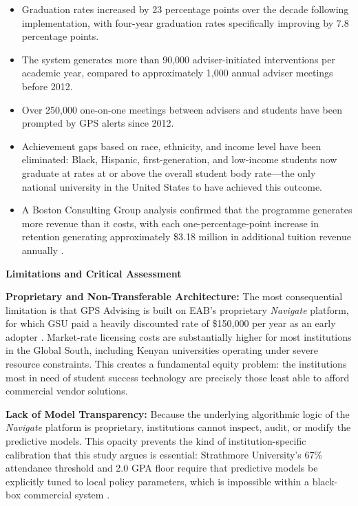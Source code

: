 \documentclass[12pt]{report}
\begin{document}
\begin{itemize}
    \item Graduation rates increased by 23 percentage points over the
    decade following implementation, with four-year graduation rates
    specifically improving by 7.8 percentage points.
    \item The system generates more than 90,000 adviser-initiated
    interventions per academic year, compared to approximately 1,000
    annual adviser meetings before 2012.
    \item Over 250,000 one-on-one meetings between advisers and students
    have been prompted by GPS alerts since 2012.
    \item Achievement gaps based on race, ethnicity, and income level
    have been eliminated: Black, Hispanic, first-generation, and
    low-income students now graduate at rates at or above the overall
    student body rate---the only national university in the United States
    to have achieved this outcome.
    \item A Boston Consulting Group analysis confirmed that the programme
    generates more revenue than it costs, with each one-percentage-point
    increase in retention generating approximately \$3.18 million in
    additional tuition revenue annually \parencite{Hechinger2019}.
\end{itemize}

\textbf{Limitations and Critical Assessment}

\textbf{Proprietary and Non-Transferable Architecture:} The most
consequential limitation is that GPS Advising is built on EAB's
proprietary \textit{Navigate} platform, for which GSU paid a heavily
discounted rate of \$150,000 per year as an early adopter
\parencite{Hechinger2019}. Market-rate licensing costs are substantially
higher for most institutions in the Global South,
including Kenyan universities operating under severe resource constraints.
This creates a fundamental equity problem: the institutions most in need
of student success technology are precisely those least able to afford
commercial vendor solutions.

\textbf{Lack of Model Transparency:} Because the underlying algorithmic
logic of the \textit{Navigate} platform is proprietary, institutions
cannot inspect, audit, or modify the predictive models. This opacity
prevents the kind of institution-specific calibration that this study
argues is essential: Strathmore University's 67\% attendance threshold
and 2.0 GPA floor require that predictive models be explicitly tuned
to local policy parameters, which is impossible within a black-box
commercial system \parencite{Hechinger2019, Signal2019}.
\end{document}

